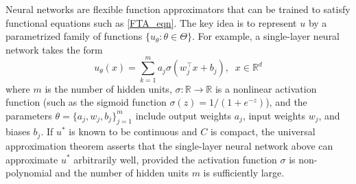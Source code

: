 \documentclass[pdflatex,sn-mathphys-ay]{sn-jnl}%
\numberwithin{equation}{section}
\newcommand\prs[1]{\left(#1\right)}
\newcommand\sbk[1]{\left[#1\right]}
\newcommand{\E}{\mathbb{E}}
\newcommand{\R}{\mathbb{R}}
\theoremstyle{thmstyleone}%
\theoremstyle{thmstyletwo}%
\theoremstyle{thmstylethree}%
\begin{document}

Neural networks are flexible function approximators that can be trained to satisfy functional equations such as \eqref{FTA_eqn}. The key idea is to represent $u$ by a parametrized family of functions $\{u_\theta:\theta\in\Theta\}$. For example, a single-layer neural network takes the form
\begin{equation}
\label{nn_eqn}
u_\theta(x)=\sum_{k=1}^ma_j\sigma(w_j^\top x+b_j),\;\;x\in\R^d
\end{equation}
where $m$ is the number of hidden units, $\sigma:\R\rightarrow\R$ is a nonlinear activation function (such as the sigmoid function $\sigma(z)=1/(1+e^{-z})$), and the parameters $\theta=\{a_j,w_j,b_j\}_{j=1}^m$ include output weights $a_j$, input weights $w_j$, and biases $b_j$. 
If $u^*$ is known to be continuous and $C$ is compact, the universal approximation theorem \citep{cybenko1989approximation} asserts that the single-layer neural network above can approximate $u^*$ arbitrarily well, provided the activation function $\sigma$ is non-polynomial and the number of hidden units $m$ is sufficiently large.
\end{document}
